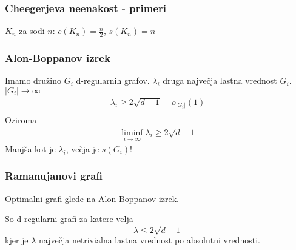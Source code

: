 \documentclass{beamer}
\begin{document}
\begin{frame}
    \frametitle{Cheegerjeva neenakost - primeri}
    \(K_n\) za sodi \(n\): \(c(K_n) = \frac{n}{2}\), \(s(K_n) = n\)
\end{frame}
\begin{frame}
    \frametitle{Alon-Boppanov izrek}
    Imamo družino \(G_i\) d-regularnih grafov. \(\lambda_i\) druga največja lastna vrednost \(G_i\). \(|G_i| \to \infty\)
    \begin{align*}
        \lambda_i \geq 2\sqrt{d-1} -o_{|G_i|}(1) \\
    \end{align*}
    Oziroma
    \begin{align*}
        \liminf_{i\to\infty} \lambda_i \geq 2\sqrt{d-1}
    \end{align*}
    Manjša kot je \(\lambda_i\), večja je \(s(G_i)\)!
\end{frame}
\begin{frame}
    \frametitle{Ramanujanovi grafi}
    Optimalni grafi glede na Alon-Boppanov izrek. \pause

    So d-regularni grafi za katere velja
    \[
        \lambda \leq 2\sqrt{d-1}
    \]
    kjer je \(\lambda\) največja netrivialna lastna vrednost po absolutni vrednosti.
\end{frame}
\end{document}
